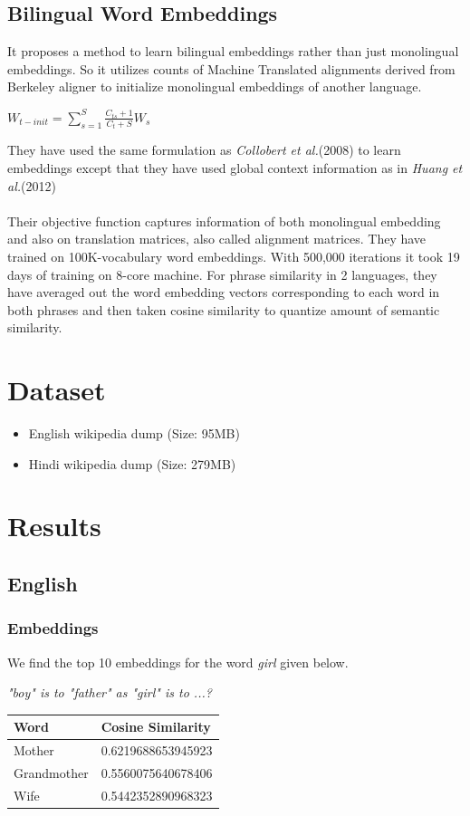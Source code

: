 \documentclass{article}
\begin{document}
\subsection{Bilingual Word Embeddings}
It proposes a method to learn bilingual embeddings rather than just monolingual embeddings. So it utilizes counts of Machine Translated alignments derived from Berkeley aligner to initialize monolingual embeddings of another language.
\begin{center} $ W_{t-init}= \sum_{s=1}^{S} \frac{C_{ts}+1}{C_{t}+S}W_{s} $  \end{center}
They have used the same formulation as \emph{Collobert et al.}(2008) to learn embeddings except that they have used global context information as in \emph{Huang et al.}(2012)\\\\
Their objective function captures information of both monolingual embedding and also on translation matrices, also called alignment matrices. They have trained on 100K-vocabulary word embeddings.
With 500,000 iterations it took 19 days of training on 8-core machine. For phrase similarity in 2 languages, they have averaged out the word embedding vectors corresponding to each word in both phrases and then taken cosine similarity to quantize amount of semantic similarity.

\section{Dataset}
\begin{itemize}
\item English wikipedia dump (Size: 95MB)
\item Hindi wikipedia dump (Size: 279MB)
\end{itemize}

\section{Results}

\subsection{English}
\subsubsection{Embeddings}
We find the top 10 embeddings for the word \emph{girl} given below.
\begin{center} \emph{"boy" is to "father" as "girl" is to ...?} \end{center}
\begin{center}
    \begin{tabular}{ | l | l |}
    \hline
    Word & Cosine Similarity  \\ \hline
    Mother & 0.6219688653945923 \\ \hline
    Grandmother & 0.5560075640678406 \\ \hline
    Wife & 0.5442352890968323 \\ \hline
    \end{tabular}
\end{center}
\end{document}
